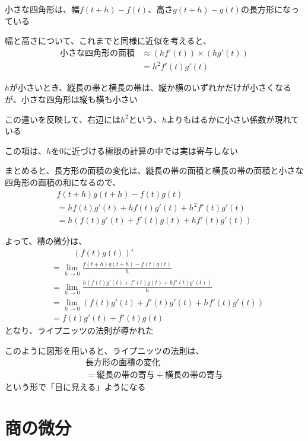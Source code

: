 \documentclass[../book_jiriki_calc]{subfiles}
\begin{document}
小さな四角形は、幅$f(t+h)-f(t)$、高さ$g(t+h)-g(t)$の長方形になっている

幅と高さについて、これまでと同様に近似を考えると、
\begin{align}
  \text{小さな四角形の面積} & \approx (hf'(t))\times (hg'(t)) \\
                   & = h^2f'(t)g'(t)
\end{align}

$h$が小さいとき、縦長の帯と横長の帯は、縦か横のいずれかだけが小さくなるが、小さな四角形は縦も横も小さい

この違いを反映して、右辺には$h^2$という、$h$よりもはるかに小さい係数が現れている

この項は、$h$を$0$に近づける極限の計算の中では実は寄与しない

\sectionline

まとめると、長方形の面積の変化は、縦長の帯の面積と横長の帯の面積と小さな四角形の面積の和になるので、
\begin{multline}
  f(t+h)g(t+h) - f(t)g(t) \\ = hf(t)g'(t) + hf(t)g'(t) + h^2f'(t)g'(t)
  \\ = h\left( f(t)g'(t) + f'(t)g(t) + hf'(t)g'(t)\right)
\end{multline}

よって、積の微分は、
\begin{align}
   & \phantom{==} (f(t)g(t))'                                                      \\
   & = \lim_{h \to 0} \frac{f(t+h)g(t+h) - f(t)g(t)}{h}                            \\
   & = \lim_{h \to 0} \frac{h\left( f(t)g'(t) + f'(t)g(t) + hf'(t)g'(t)\right)}{h} \\
   & = \lim_{h \to 0} \left( f(t)g'(t) + f'(t)g'(t)+ hf'(t)g'(t)\right)            \\
   & = f(t)g'(t) + f'(t)g(t)
\end{align}
となり、ライプニッツの法則が導かれた

\sectionline

このように図形を用いると、ライプニッツの法則は、
\begin{multline}
  \text{長方形の面積の変化} \\ = \text{縦長の帯の寄与} + \text{横長の帯の寄与}
\end{multline}
という形で「目に見える」ようになる

\section{商の微分}
\end{document}
